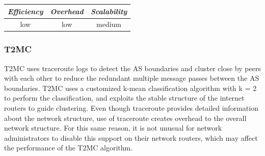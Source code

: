 \begin{center}
\begin{tabular}{ccc}
\emph{Efficiency} & \emph{Overhead} & \emph{Scalability} \\
\hline
low &
%
low &
%
medium
\end{tabular}
\end{center}

\subsubsection{T2MC}

T2MC \cite{SLCGZ2008} uses traceroute logs to detect the AS boundaries and
cluster close by peers with each other to reduce the redundant multiple message
passes between the AS boundaries. T2MC uses a customized k-mean classification
algorithm with k = 2 to perform the classification, and exploits the stable
structure of the internet routers to guide clustering. Even though traceroute
provides detailed information about the network structure, use of traceroute
creates overhead to the overall network structure. For this same reason, it is
not unusual for network administrators to disable this support on their network
routers, which may affect the performance of the T2MC algorithm.



